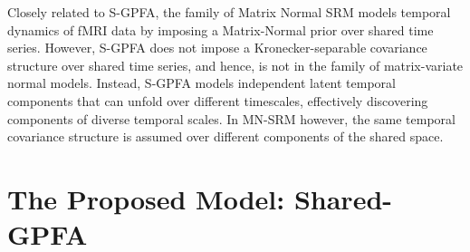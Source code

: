 Closely related to S-GPFA, the family of Matrix Normal SRM \cite{mnsrm} models temporal dynamics of fMRI data by imposing a Matrix-Normal prior over shared time series. However, S-GPFA does not impose a Kronecker-separable covariance structure over shared time series, and hence, is not in the family of matrix-variate normal models. Instead, S-GPFA models independent latent temporal components that can unfold over different timescales, effectively discovering components of diverse temporal scales. In MN-SRM however, the same temporal covariance structure is assumed over different components of the shared space.

\section{The Proposed Model: Shared-GPFA}
\label{ch1:sec:sgpfa}


